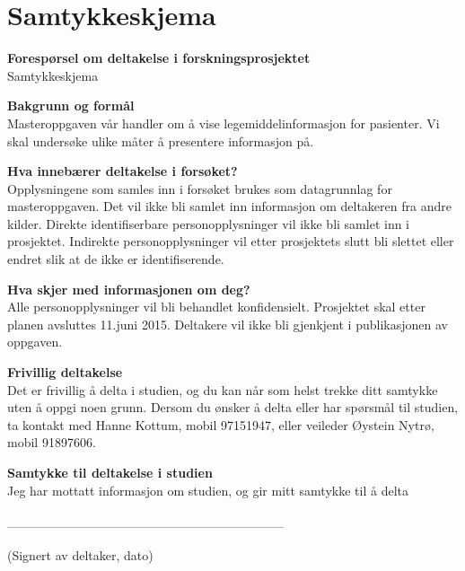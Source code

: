 \chapter{Samtykkeskjema} \label{chap:samtykke}

\begin{center}
    \textbf{Forespørsel om deltakelse i forskningsprosjektet} \\
    Samtykkeskjema
\end{center}

\textbf{Bakgrunn og formål} \\
Masteroppgaven vår handler om å vise legemiddelinformasjon for pasienter. Vi skal undersøke ulike måter å presentere informasjon på. 

\textbf{Hva innebærer deltakelse i forsøket?} \\
Opplysningene som samles inn i forsøket brukes som datagrunnlag for masteroppgaven. Det vil ikke bli samlet inn informasjon om deltakeren fra andre kilder. Direkte identifiserbare personopplysninger vil ikke bli samlet inn i prosjektet. Indirekte personopplysninger vil etter prosjektets slutt bli slettet eller endret slik at de ikke er identifiserende. 

\textbf{Hva skjer med informasjonen om deg?} \\
Alle personopplysninger vil bli behandlet konfidensielt. Prosjektet skal etter planen avsluttes 11.juni 2015. Deltakere vil ikke bli gjenkjent i publikasjonen av oppgaven.

\textbf{Frivillig deltakelse}\\
Det er frivillig å delta i studien, og du kan når som helst trekke ditt samtykke uten å oppgi noen grunn. Dersom du ønsker å delta eller har spørsmål til studien, ta kontakt med Hanne Kottum, mobil 97151947, eller veileder Øystein Nytrø, mobil 91897606. 

\pagebreak

\textbf{Samtykke til deltakelse i studien}\\
Jeg har mottatt informasjon om studien, og gir mitt samtykke til å delta 
\\
\\
------------------------------------------------------------------

(Signert av deltaker, dato)